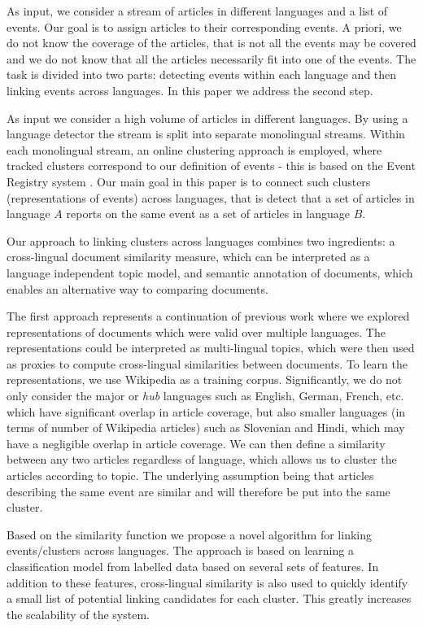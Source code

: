 \documentclass[twoside,11pt]{article}
\begin{document}
As input, we consider a stream of articles in different languages and a list of events. Our goal is to assign articles to their corresponding events. A priori, we do not know the coverage of the articles, that is not all the events may be covered and we do not know that all the articles necessarily fit into one of the events. The task is divided into two parts: detecting events within each language and then linking events across languages. In this paper we address the second step.

As input we consider a high volume of articles in different languages. By using a language detector the stream is split into separate monolingual streams. Within each monolingual stream, an online clustering approach is employed, where tracked clusters correspond to our definition of events - this is based on the Event Registry system . Our main goal in this paper is to connect such clusters (representations of events) across languages, that is detect that a set of articles in language $A$ reports on the same event as a set of articles in language $B$.

Our approach to linking clusters across languages combines two ingredients: a cross-lingual document similarity measure, which can be interpreted as a language independent topic model, and semantic annotation of documents, which enables an alternative way to comparing documents.

The first approach represents a continuation of previous work  where we explored representations of documents which were valid over multiple languages.  The representations could be interpreted as multi-lingual topics, which were then used as proxies to compute cross-lingual similarities between documents. To learn the representations, we use Wikipedia as a training corpus. Significantly, we do not only consider the major or \emph{hub} languages such as English, German, French, etc. which have significant overlap in article coverage, but also smaller languages (in terms of number of Wikipedia articles) such as Slovenian and Hindi, which may have a negligible overlap in article coverage. We can then define a similarity between any two articles regardless of language,  which allows us to cluster the articles according to topic. The underlying assumption being that articles describing the same event are similar  and will therefore be put into the same cluster.

Based on the similarity function we propose a novel algorithm for linking events/clusters across languages. The approach is based on learning a classification model from labelled data based on several sets of features. In addition to these features, cross-lingual similarity is also used to quickly identify a small list of potential linking candidates for each cluster.
This greatly increases the scalability of the system.
\end{document}

